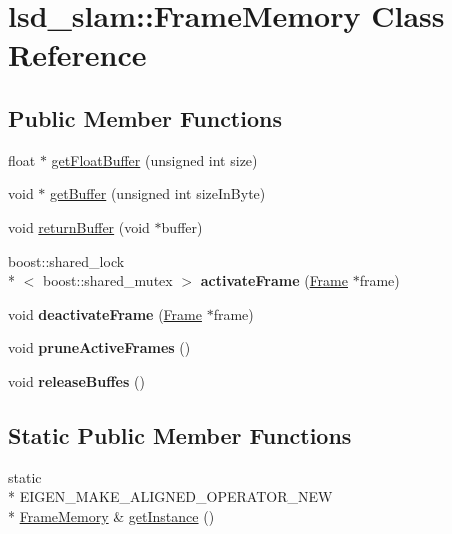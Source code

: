 \hypertarget{classlsd__slam_1_1_frame_memory}{\section{lsd\-\_\-slam\-:\-:Frame\-Memory Class Reference}
\label{classlsd__slam_1_1_frame_memory}
}
\subsection*{Public Member Functions}
\begin{DoxyCompactItemize}
\item 
float $\ast$ \hyperlink{classlsd__slam_1_1_frame_memory_a37a4c4d430529480053d728339518aad}{get\-Float\-Buffer} (unsigned int size)
\item 
void $\ast$ \hyperlink{classlsd__slam_1_1_frame_memory_ac045fd3982d7e1bf6c1ea6e2bf4ac346}{get\-Buffer} (unsigned int size\-In\-Byte)
\item 
void \hyperlink{classlsd__slam_1_1_frame_memory_a04c59c5c8cfd2b65b4d7ce7b7d6ba493}{return\-Buffer} (void $\ast$buffer)
\item 
\hypertarget{classlsd__slam_1_1_frame_memory_a3559b2f956a82e98f5fa8926747d2a61}{boost\-::shared\-\_\-lock\\*
$<$ boost\-::shared\-\_\-mutex $>$ {\bfseries activate\-Frame} (\hyperlink{classlsd__slam_1_1_frame}{Frame} $\ast$frame)}\label{classlsd__slam_1_1_frame_memory_a3559b2f956a82e98f5fa8926747d2a61}

\item 
\hypertarget{classlsd__slam_1_1_frame_memory_aa44bf3b85a471ccb4c4c7da53f395ec6}{void {\bfseries deactivate\-Frame} (\hyperlink{classlsd__slam_1_1_frame}{Frame} $\ast$frame)}\label{classlsd__slam_1_1_frame_memory_aa44bf3b85a471ccb4c4c7da53f395ec6}

\item 
\hypertarget{classlsd__slam_1_1_frame_memory_a39ebe0415eda3609bf80481b02fe7efc}{void {\bfseries prune\-Active\-Frames} ()}\label{classlsd__slam_1_1_frame_memory_a39ebe0415eda3609bf80481b02fe7efc}

\item 
\hypertarget{classlsd__slam_1_1_frame_memory_aec600d5495fb555f10b6d3383513d0c6}{void {\bfseries release\-Buffes} ()}\label{classlsd__slam_1_1_frame_memory_aec600d5495fb555f10b6d3383513d0c6}

\end{DoxyCompactItemize}
\subsection*{Static Public Member Functions}
\begin{DoxyCompactItemize}
\item 
static \\*
E\-I\-G\-E\-N\-\_\-\-M\-A\-K\-E\-\_\-\-A\-L\-I\-G\-N\-E\-D\-\_\-\-O\-P\-E\-R\-A\-T\-O\-R\-\_\-\-N\-E\-W \\*
\hyperlink{classlsd__slam_1_1_frame_memory}{Frame\-Memory} \& \hyperlink{classlsd__slam_1_1_frame_memory_a3e5de8ca8abd78fe266381a64adf3ac2}{get\-Instance} ()
\end{DoxyCompactItemize}


